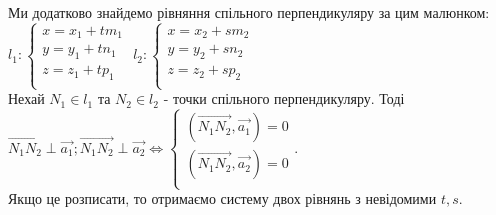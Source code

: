 \documentclass[a4paper, 10pt]{extarticle}
\theoremstyle{theoremdd}
\theoremstyle{theoremdd}
\theoremstyle{theoremdd}
\theoremstyle{theoremdd}
\theoremstyle{theoremdd}
\theoremstyle{theoremdd}
\theoremstyle{theoremdd}
\theoremstyle{theoremdd}
\begin{document}
Ми додатково знайдемо рівняння спільного перпендикуляру за цим малюнком:\\
$l_1: \begin{cases}
x = x_1 + tm_1 \\
y = y_1 + tn_1 \\
z = z_1 + tp_1 \\
\end{cases}$ \hspace{1cm}
$l_2: \begin{cases}
x = x_2 + sm_2 \\
y = y_2 + sn_2 \\
z = z_2 + sp_2 \\
\end{cases}$
\\
Нехай $N_1 \in l_1$ та $N_2 \in l_2$ - точки спільного перпендикуляру. Тоді $\overrightarrow{N_1 N_2} \perp \vec{a_1}; \overrightarrow{N_1 N_2} \perp \vec{a_2} \iff \begin{cases}
 (\overrightarrow{N_1 N_2}, \vec{a_1}) = 0\\
 (\overrightarrow{N_1 N_2}, \vec{a_2}) = 0\\
 \end{cases}$.\\
Якщо це розписати, то отримаємо систему двох рівнянь з невідомими $t,s$.

\iffalse
\end{document}
